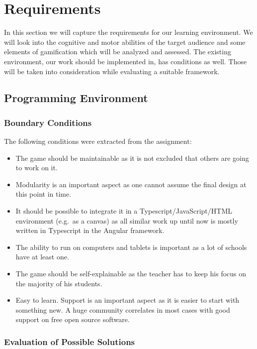 
\chapter{Requirements}\label{ch:requirements}
In this section we will capture the requirements for our learning environment.
We will look into the cognitive and motor abilities of the target audience and
some elements of gamification which will be analyzed and assessed.
The existing environment, our work should be implemented in, has conditions as well.
Those will be taken into consideration while evaluating a suitable framework.

\section{Programming Environment}\label{sec:programming-environment}
\subsection{Boundary Conditions}\label{subsec:boundary-conditions}
The following conditions were extracted from the assignment:

\begin{itemize}
    \item The game should be maintainable as it is not excluded that others are going to work on it.
    \item Modularity is an important aspect as one cannot assume the final design at this point in time.
    \item It should be possible to integrate it in a Typescript/JavaScript/HTML environment (e.g.\ as a canvas) as
    all similar work up until now is mostly written in Typescript in the Angular framework.
    \item The ability to run on computers and tablets is important as a lot of schools have at least one.
    \item The game should be self-explainable as the teacher has to keep his focus on the majority of his students.
    \item Easy to learn. Support is an important aspect as it is easier to start with something new.
    A huge community correlates in most cases with good support on free open source software.
\end{itemize}

\subsection{Evaluation of Possible Solutions}\label{subsec:evaluation-of-possible-solutions}
